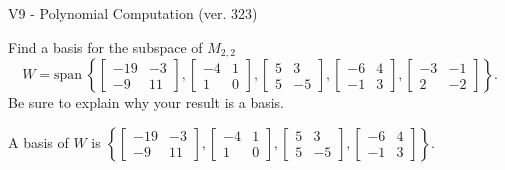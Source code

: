 \begin{exercise}
  \begin{exerciseTitle}V9 - Polynomial Computation (ver. 323)\end{exerciseTitle}
  \begin{exerciseStatement}
    Find a basis for the subspace of \(M_{2,2}\) 
\[W=\mathrm{span}\ \left\{\left[\begin{array}{cc}
-19 & -3 \\
-9 & 11
\end{array}\right] , \left[\begin{array}{cc}
-4 & 1 \\
1 & 0
\end{array}\right] , \left[\begin{array}{cc}
5 & 3 \\
5 & -5
\end{array}\right] , \left[\begin{array}{cc}
-6 & 4 \\
-1 & 3
\end{array}\right] , \left[\begin{array}{cc}
-3 & -1 \\
2 & -2
\end{array}\right]\right\}.\]
 Be sure to explain why your result is a basis.


  \end{exerciseStatement}
  \begin{exerciseAnswer}
   A basis of \(W\) is  \(\left\{\left[\begin{array}{cc}
-19 & -3 \\
-9 & 11
\end{array}\right] , \left[\begin{array}{cc}
-4 & 1 \\
1 & 0
\end{array}\right] , \left[\begin{array}{cc}
5 & 3 \\
5 & -5
\end{array}\right] , \left[\begin{array}{cc}
-6 & 4 \\
-1 & 3
\end{array}\right]\right\}\).
  


  \end{exerciseAnswer}
\end{exercise}